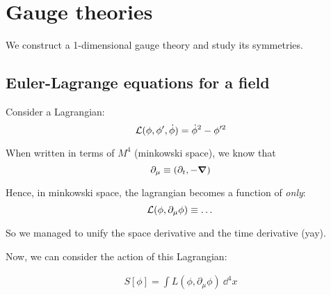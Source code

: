 \chapter{Gauge theories}
We construct a 1-dimensional gauge theory and study its symmetries.

\section{Euler-Lagrange equations for a field}
Consider a Lagrangian:
$$\mathcal{L}(\phi, \phi', \dot \phi) = {\dot \phi}^2  - \phi'^2$$

When written in terms of $M^4$ (minkowski space), we know that
$$
\partial_\mu \equiv (\partial_{t}, - \grad)
$$

Hence, in minkowski space, the lagrangian becomes a function of \textit{only}:
$$
\mathcal{L}(\phi, \partial_\mu \phi) \equiv \dots
$$

So we managed to unify the space derivative and the time derivative (yay).

Now, we can consider the action of this Lagrangian:

\begin{align*}
    S[\phi] = \int L(\phi, \partial_\mu \phi)~\dd^4x
\end{align*}

